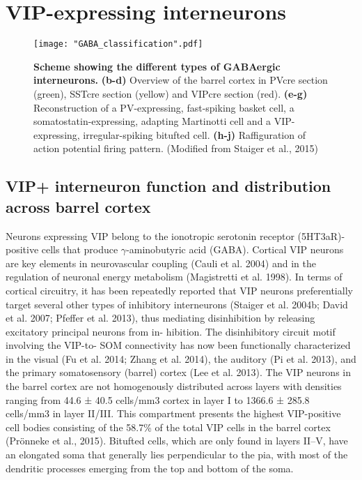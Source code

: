 \section{VIP-expressing interneurons }
\label{sec:VIP}
\begin{figure}[!h]
	\captionsetup[figure]{indentation=0pt}
	\texttt{[image: "GABA\_classification".pdf]}
	\caption[Scheme showing the different types of GABAergic interneurons.]{\textbf{Scheme showing the different types of GABAergic interneurons.} \textbf{(b-d)} Overview of the barrel cortex in PVcre section (green), SSTcre section (yellow) and VIPcre section (red). \textbf{(e-g)} Reconstruction of a PV-expressing, fast-spiking basket cell, a somatostatin-expressing, adapting Martinotti cell and a VIP-expressing, irregular-spiking bitufted cell. \textbf{(h-j)} Raffiguration of action potential firing pattern. (Modified from Staiger et al., 2015)}	
	\label{fig:gaba_classes}
\end{figure}
 
\subsection{VIP+ interneuron function and distribution across barrel cortex}
\label{subsec:vip distribution}
Neurons expressing VIP belong to the ionotropic serotonin receptor (5HT3aR)-positive cells that produce $ \gamma $-aminobutyric acid (GABA). 
Cortical VIP neurons are key elements in neurovascular coupling (Cauli et al. 2004) and in the regulation of neuronal energy metabolism (Magistretti et al. 1998). In terms of cortical circuitry, it has been repeatedly reported that VIP neurons preferentially target several other types of inhibitory interneurons (Staiger et al. 2004b; David et al. 2007; Pfeffer et al. 2013), thus mediating disinhibition by releasing excitatory principal neurons from in- hibition. The disinhibitory circuit motif involving the VIP-to- SOM connectivity has now been functionally characterized in the visual (Fu et al. 2014;  Zhang et al. 2014), the auditory (Pi et al. 2013), and the primary somatosensory (barrel) cortex (Lee et al. 2013).
The VIP neurons in the barrel cortex are not homogenously distributed across layers with densities ranging from 44.6 ± 40.5 cells/mm3 cortex in layer I to 1366.6 ± 285.8 cells/mm3 in layer II/III. This compartment presents the highest VIP-positive cell bodies consisting of the 58.7\% of the total VIP cells in the barrel cortex (Prönneke et al., 2015). 
Bitufted cells, which are only found in layers II–V, have an elongated soma that generally lies perpendicular to the pia, with most of the dendritic processes emerging from the top and bottom of the soma.
